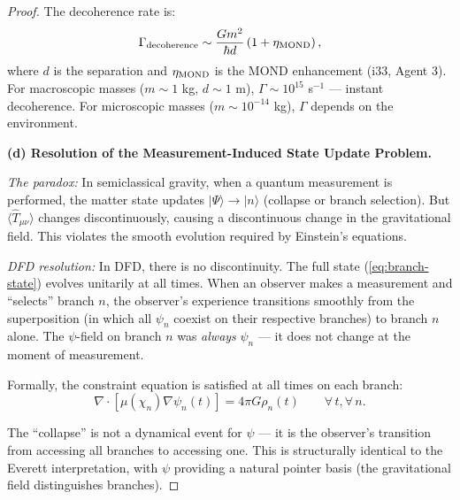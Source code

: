 \documentclass[11pt,a4paper]{article}
\begin{document}
\begin{proof}
The decoherence rate is:
\begin{equation}
\Gamma_{\rm decoherence} \sim \frac{G m^2}{\hbar d}\left(1 + \eta_{\rm MOND}\right),
\end{equation}
where $d$ is the separation and $\eta_{\rm MOND}$ is the MOND enhancement (i33, Agent 3). For macroscopic masses ($m \sim 1$ kg, $d \sim 1$ m), $\Gamma \sim 10^{15}$ s$^{-1}$ --- instant decoherence. For microscopic masses ($m \sim 10^{-14}$ kg), $\Gamma$ depends on the environment.

\textbf{(d) Resolution of the Measurement-Induced State Update Problem.}

\emph{The paradox:} In semiclassical gravity, when a quantum measurement is performed, the matter state updates $|\Psi\rangle \to |n\rangle$ (collapse or branch selection). But $\langle\hat{T}_{\mu\nu}\rangle$ changes discontinuously, causing a discontinuous change in the gravitational field. This violates the smooth evolution required by Einstein's equations.

\emph{DFD resolution:} In DFD, there is no discontinuity. The full state (\ref{eq:branch-state}) evolves unitarily at all times. When an observer makes a measurement and ``selects'' branch $n$, the observer's experience transitions smoothly from the superposition (in which all $\psi_n$ coexist on their respective branches) to branch $n$ alone. The $\psi$-field on branch $n$ was \emph{always} $\psi_n$ --- it does not change at the moment of measurement.

Formally, the constraint equation is satisfied at all times on each branch:
\begin{equation}
\nabla\cdot[\mu(\chi_n)\nabla\psi_n(t)] = 4\pi G\rho_n(t) \qquad \forall\, t, \forall\, n.
\end{equation}

The ``collapse'' is not a dynamical event for $\psi$ --- it is the observer's transition from accessing all branches to accessing one. This is structurally identical to the Everett interpretation, with $\psi$ providing a natural pointer basis (the gravitational field distinguishes branches).
\end{proof}
\end{document}

